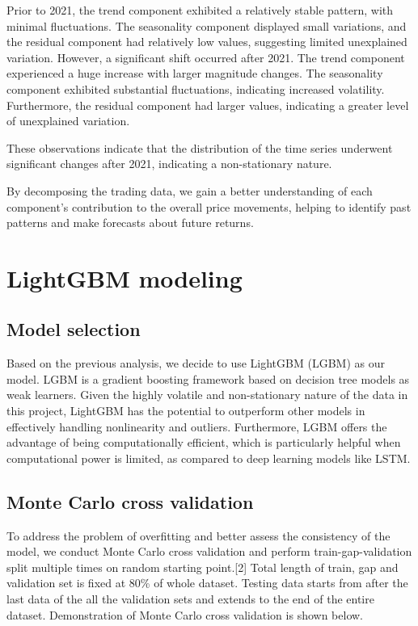 \documentclass{article}
\begin{document}
Prior to 2021, the trend component exhibited a relatively stable pattern, with minimal fluctuations. The seasonality component displayed small variations, and the residual component had relatively low values, suggesting limited unexplained variation. However, a significant shift occurred after 2021. The trend component experienced a huge increase with larger magnitude changes. The seasonality component exhibited substantial fluctuations, indicating increased volatility. Furthermore, the residual component had larger values, indicating a greater level of unexplained variation. 

These observations indicate that the distribution of the time series underwent significant changes after 2021, indicating a non-stationary nature.

By decomposing the trading data, we gain a better understanding of each component's contribution to the overall price movements, helping to identify past patterns and make forecasts about future returns.


\section{LightGBM modeling}

\subsection{Model selection}
Based on the previous analysis, we decide to use LightGBM (LGBM) as our model. LGBM is a gradient boosting framework based on decision tree models as weak learners. Given the highly volatile and non-stationary nature of the data in this project, LightGBM has the potential to outperform other models in effectively handling nonlinearity and outliers. Furthermore, LGBM offers the advantage of being computationally efficient, which is particularly helpful when computational power is limited, as compared to deep learning models like LSTM.

\subsection{Monte Carlo cross validation}
To address the problem of overfitting and better assess the consistency of the model, we conduct Monte Carlo cross validation and perform train-gap-validation split multiple times on random starting point.[2] Total length of train, gap and validation set is fixed at 80\% of whole dataset. Testing data starts from after the last data of the all the validation sets and extends to the end of the entire dataset. Demonstration of Monte Carlo cross validation is shown below.
\end{document}

